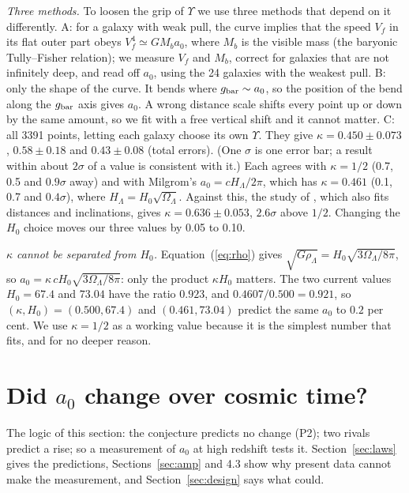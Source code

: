 \documentclass[fleqn,usenatbib]{mnras}
\begin{document}
\emph{Three methods.} To loosen the grip of $\Upsilon$ we use three methods that depend on it differently. A: for a galaxy with weak pull, the curve implies that the speed $V_f$ in its flat outer part obeys $V_f^4\simeq GM_ba_0$, where $M_b$ is the visible mass (the baryonic Tully--Fisher relation); we measure $V_f$ and $M_b$, correct for galaxies that are not infinitely deep, and read off $a_0$, using the 24 galaxies with the weakest pull. B: only the shape of the curve. It bends where $g_{\rm bar}\sim a_0$, so the position of the bend along the $g_{\rm bar}$ axis gives $a_0$. A wrong distance scale shifts every point up or down by the same amount, so we fit with a free vertical shift and it cannot matter. C: all 3391 points, letting each galaxy choose its own $\Upsilon$. They give $\kappa=0.450\pm0.073$, $0.58\pm0.18$ and $0.43\pm0.08$ (total errors). (One $\sigma$ is one error bar; a result within about $2\sigma$ of a value is consistent with it.) Each agrees with $\kappa=1/2$ (0.7, 0.5 and $0.9\sigma$ away) and with Milgrom's $a_0=cH_\Lambda/2\pi$, which has $\kappa=0.461$ (0.1, 0.7 and $0.4\sigma$), where $H_\Lambda=H_0\sqrt{\Omega_\Lambda}$. Against this, the study of \citet{Desmond2023}, which also fits distances and inclinations, gives $\kappa=0.636\pm0.053$, $2.6\sigma$ above $1/2$. Changing the $H_0$ choice moves our three values by 0.05 to 0.10.

\emph{$\kappa$ cannot be separated from $H_0$.} Equation~(\ref{eq:rho}) gives $\sqrt{G\rho_\Lambda}=H_0\sqrt{3\Omega_\Lambda/8\pi}$, so $a_0=\kappa\,cH_0\sqrt{3\Omega_\Lambda/8\pi}$: only the product $\kappa H_0$ matters. The two current values $H_0=67.4$ and $73.04$ \citep{Riess2022} have the ratio $0.923$, and $0.4607/0.500=0.921$, so $(\kappa,H_0)=(0.500,67.4)$ and $(0.461,73.04)$ predict the same $a_0$ to $0.2$ per cent. We use $\kappa=1/2$ as a working value because it is the simplest number that fits, and for no deeper reason.

\section{Did $a_0$ change over cosmic time?}
\label{sec:ztest}
The logic of this section: the conjecture predicts no change (P2); two rivals predict a rise; so a measurement of $a_0$ at high redshift tests it. Section~\ref{sec:laws} gives the predictions, Sections~\ref{sec:amp} and 4.3 show why present data cannot make the measurement, and Section~\ref{sec:design} says what could.
\end{document}
